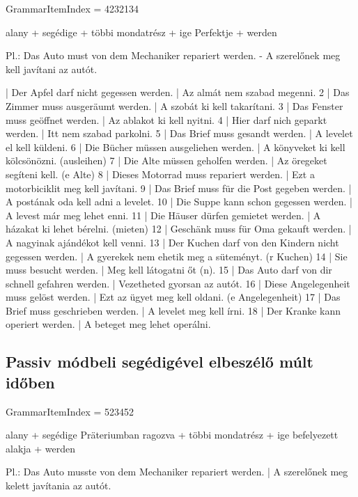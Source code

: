 \documentclass{article}
\newenvironment{desc}{\verbatim}{\endverbatim}
\newenvironment{exmp}{\verbatim}{\endverbatim}
\begin{document}
GrammarItemIndex = 4232134

\begin{desc}
alany + segédige + többi mondatrész + ige Perfektje + werden

Pl.: Das Auto must von dem Mechaniker repariert werden. - A szerelőnek meg kell javítani az autót.
\end{desc}

\begin{exmp}
1 | Der Apfel darf nicht gegessen werden. | Az almát nem szabad megenni.
2 | Das Zimmer muss ausgeräumt werden. | A szobát ki kell takarítani.
3 | Das Fenster muss geöffnet werden. | Az ablakot ki kell nyitni.
4 | Hier darf nich geparkt werden. | Itt nem szabad parkolni.
5 | Das Brief muss gesandt werden. | A levelet el kell küldeni.
6 | Die Bücher müssen ausgeliehen werden. | A könyveket ki kell kölcsönözni. (ausleihen)
7 | Die Alte müssen geholfen werden. | Az öregeket segíteni kell. (e Alte)
8 | Dieses Motorrad muss repariert werden. | Ezt a motorbiciklit meg kell javítani.
9 | Das Brief muss für die Post gegeben werden. | A postának oda kell adni a levelet.
10 | Die Suppe kann schon gegessen werden. | A levest már meg lehet enni.
11 | Die Häuser dürfen gemietet werden. | A házakat ki lehet bérelni. (mieten)
12 | Geschänk muss für Oma gekauft werden. | A nagyinak ajándékot kell venni.
13 | Der Kuchen darf von den Kindern nicht gegessen werden. | A gyerekek nem ehetik meg a süteményt. (r Kuchen)
14 | Sie muss besucht werden. | Meg kell látogatni őt (n).
15 | Das Auto darf von dir schnell gefahren werden. | Vezetheted gyorsan az autót.
16 | Diese Angelegenheit muss gelöst werden. | Ezt az ügyet meg kell oldani. (e Angelegenheit)
17 | Das Brief muss geschrieben werden. | A levelet meg kell írni.
18 | Der Kranke kann operiert werden. | A beteget meg lehet operálni.
\end{exmp}

\subsection{Passiv módbeli segédigével elbeszélő múlt időben}

GrammarItemIndex = 523452

\begin{desc}
alany + segédige Präteriumban ragozva + többi mondatrész + ige befelyezett alakja + werden

Pl.: Das Auto musste von dem Mechaniker repariert werden. | A szerelőnek meg kelett javítania az autót.
\end{desc}
\end{document}
